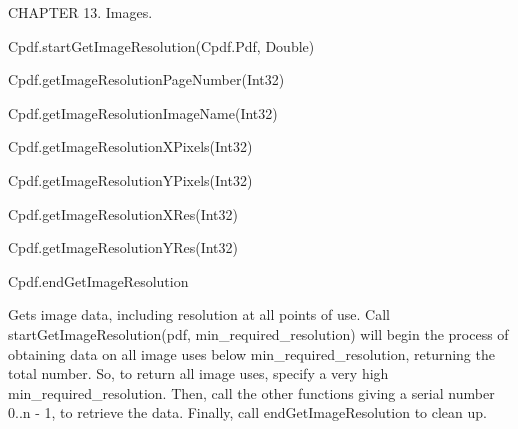 CHAPTER 13. Images.

Cpdf.startGetImageResolution(Cpdf.Pdf, Double)

Cpdf.getImageResolutionPageNumber(Int32)

Cpdf.getImageResolutionImageName(Int32)

Cpdf.getImageResolutionXPixels(Int32)

Cpdf.getImageResolutionYPixels(Int32)

Cpdf.getImageResolutionXRes(Int32)

Cpdf.getImageResolutionYRes(Int32)

Cpdf.endGetImageResolution

Gets image data, including resolution at all points of use. Call
startGetImageResolution(pdf, min_required_resolution) will begin the
process of obtaining data on all image uses below min_required_resolution, 
returning the total number. So, to return all image uses, specify a very
high min_required_resolution. Then, call the other functions giving a
serial number 0..n - 1, to retrieve the data. Finally, call
endGetImageResolution to clean up.
